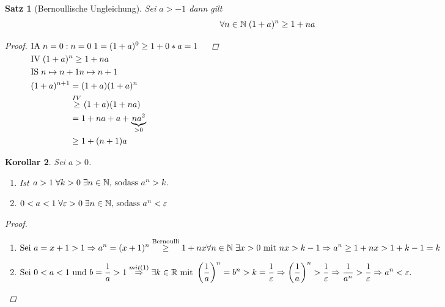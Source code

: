 \documentclass[a4paper,titlepage,oneside]{article}
\def\N{\ensuremath{\mathbb{N}} }
\def\R{\ensuremath{\mathbb{R}} }
\renewcommand{\epsilon}{\ensuremath{\varepsilon} }
\newcommand{\IA}[1][n=0]{\vspace{0.1pt}\ensuremath{\text{IA}\sp#1:}}
\newcommand{\IV}{\vspace{0.1pt}\ensuremath{\text{IV}\sp}}
\newcommand{\IS}[1][n \mapsto n+1]{\vspace{0.1pt}\ensuremath{\text{IS}\sp#1}}
\def\fa{\ensuremath{\forall}}
\def\sp{\hspace{0,1cm}}
\theoremstyle{thmstyle}
\newtheorem{satz}{Satz}[subsection]
\newtheorem{korr}[satz]{Korollar}
\begin{document}
\begin{satz}[Bernoullische Ungleichung]
Sei \(a > -1\) dann gilt \[\fa n \in \N \sp (1+a)^n \ge 1 + na \]
\begin{proof}
\begin{math}
\begin{aligned}[t]
	&\IA{n=0} \sp 1 = (1 + a)^0 \ge 1 + 0*a = 1					&&\\
	&\IV (1+a)^n \ge 1 + na								&&\\
	&\IS{n \mapsto n+1} \\
	&\begin{aligned}[t]
		(1+a)^{n+1} 	&= (1+a)(1+a)^n 					&&\\
					&\overset{IV}{\ge} (1 + a)(1 + na) 		&&\\
					&= 1 + na + a + \underbrace{na^2}_{> 0} 	&&\\
					&\ge 1 + (n+1)a \end{aligned}
\end{aligned}
\end{math}
\newline
\end{proof}
\end{satz}
\newpage

\begin{korr}
Sei \(a > 0\).
\begin{enumerate}[label=(\arabic*)]
	\item Ist \sp \(a > 1 \sp \forall k > 0 \sp \exists n \in \N \text{, sodass }a^n > k.\)
	\item \(0 < a < 1 \sp \forall \epsilon > 0 \sp \exists n \in \N \text{, sodass }a^n < \epsilon\)
\end{enumerate}
\begin{proof}\sp
\begin{enumerate}[label=(\arabic*)]
	\item \begin{math} \displaystyle
		\text{Sei } a = x + 1 > 1 \Rightarrow a^n = (x + 1)^n \overset{\text{Bernoulli}}{\ge} 1 + nx \\
		\forall n \in \N \sp \exists x > 0 \text{ mit } nx > k - 1 \Rightarrow a^n \ge 1 + nx > 1 + k -1 = k
		\end{math}
	\item \begin{math} \displaystyle
		\text{Sei } 0 < a < 1 \text{ und } b = \frac{1}{a} > 1 \overset{\tiny{mit (1)}}{\Rightarrow} \exists k \in \R \text{ mit }  \left(\frac{1}{a}\right)^n = b^n > k = \frac{1}{\epsilon}\\
		\Rightarrow  \left(\frac{1}{a}\right)^n > \frac{1}{\epsilon} \Rightarrow  \frac{1}{a^n} > \frac{1}{\epsilon} \Rightarrow a^n < \epsilon.
		\end{math}
\end{enumerate}
\end{proof}
\end{korr}
\end{document}
